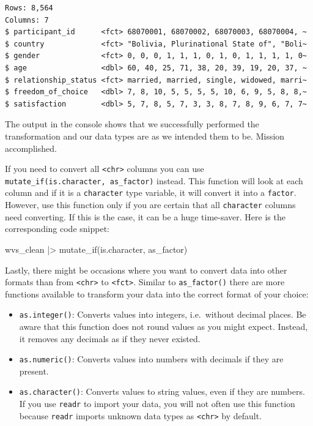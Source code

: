 \documentclass[
  letterpaper,
  DIV=11,
  numbers=noendperiod]{scrreprt}
\newenvironment{Shaded}{\begin{snugshade}}{\end{snugshade}}
\newcommand{\FunctionTok}[1]{\textcolor[rgb]{0.28,0.35,0.67}{#1}}
\newcommand{\NormalTok}[1]{\textcolor[rgb]{0.00,0.23,0.31}{#1}}
\newcommand{\SpecialCharTok}[1]{\textcolor[rgb]{0.37,0.37,0.37}{#1}}
\begin{document}
\begin{verbatim}
Rows: 8,564
Columns: 7
$ participant_id      <fct> 68070001, 68070002, 68070003, 68070004, ~
$ country             <fct> "Bolivia, Plurinational State of", "Boli~
$ gender              <fct> 0, 0, 0, 1, 1, 1, 0, 1, 0, 1, 1, 1, 1, 0~
$ age                 <dbl> 60, 40, 25, 71, 38, 20, 39, 19, 20, 37, ~
$ relationship_status <fct> married, married, single, widowed, marri~
$ freedom_of_choice   <dbl> 7, 8, 10, 5, 5, 5, 5, 10, 6, 9, 5, 8, 8,~
$ satisfaction        <dbl> 5, 7, 8, 5, 7, 3, 3, 8, 7, 8, 9, 6, 7, 7~
\end{verbatim}

The output in the console shows that we successfully performed the
transformation and our data types are as we intended them to be. Mission
accomplished.

If you need to convert all \texttt{\textless{}chr\textgreater{}} columns
you can use \texttt{mutate\_if(is.character,\ as\_factor)} instead. This
function will look at each column and if it is a \texttt{character} type
variable, it will convert it into a \texttt{factor}. However, use this
function only if you are certain that all \texttt{character} columns
need converting. If this is the case, it can be a huge time-saver. Here
is the corresponding code snippet:

\begin{Shaded}
\begin{Highlighting}[]
\NormalTok{wvs\_clean }\SpecialCharTok{|\textgreater{}}
  \FunctionTok{mutate\_if}\NormalTok{(is.character, as\_factor)}
\end{Highlighting}
\end{Shaded}

Lastly, there might be occasions where you want to convert data into
other formats than from \texttt{\textless{}chr\textgreater{}} to
\texttt{\textless{}fct\textgreater{}}. Similar to \texttt{as\_factor()}
there are more functions available to transform your data into the
correct format of your choice:

\begin{itemize}
\item
  \texttt{as.integer()}: Converts values into integers, i.e.~without
  decimal places. Be aware that this function does not round values as
  you might expect. Instead, it removes any decimals as if they never
  existed.
\item
  \texttt{as.numeric()}: Converts values into numbers with decimals if
  they are present.
\item
  \texttt{as.character()}: Converts values to string values, even if
  they are numbers. If you use \texttt{readr} to import your data, you
  will not often use this function because \texttt{readr} imports
  unknown data types as \texttt{\textless{}chr\textgreater{}} by
  default.
\end{itemize}
\end{document}
